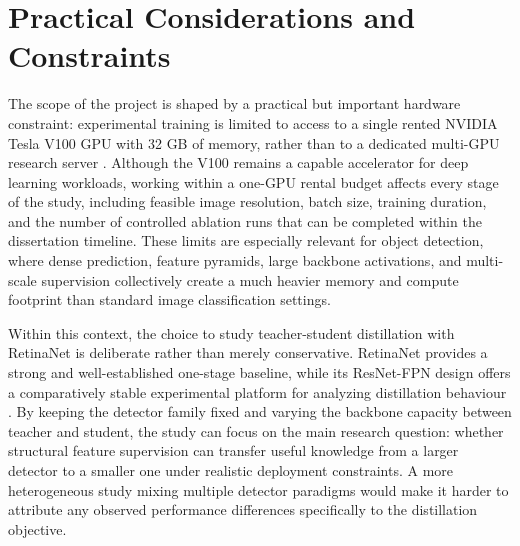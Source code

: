 \section{Practical Considerations and Constraints}

The scope of the project is shaped by a practical but important hardware constraint: experimental training is limited to access to a single rented NVIDIA Tesla V100 GPU with 32 GB of memory, rather than to a dedicated multi-GPU research server \cite{nvidia2017v100}. Although the V100 remains a capable accelerator for deep learning workloads, working within a one-GPU rental budget affects every stage of the study, including feasible image resolution, batch size, training duration, and the number of controlled ablation runs that can be completed within the dissertation timeline. These limits are especially relevant for object detection, where dense prediction, feature pyramids, large backbone activations, and multi-scale supervision collectively create a much heavier memory and compute footprint than standard image classification settings.

Within this context, the choice to study teacher-student distillation with RetinaNet is deliberate rather than merely conservative. RetinaNet provides a strong and well-established one-stage baseline, while its ResNet-FPN design offers a comparatively stable experimental platform for analyzing distillation behaviour \cite{lin2017fpn,lin2017focal}. By keeping the detector family fixed and varying the backbone capacity between teacher and student, the study can focus on the main research question: whether structural feature supervision can transfer useful knowledge from a larger detector to a smaller one under realistic deployment constraints. A more heterogeneous study mixing multiple detector paradigms would make it harder to attribute any observed performance differences specifically to the distillation objective.

